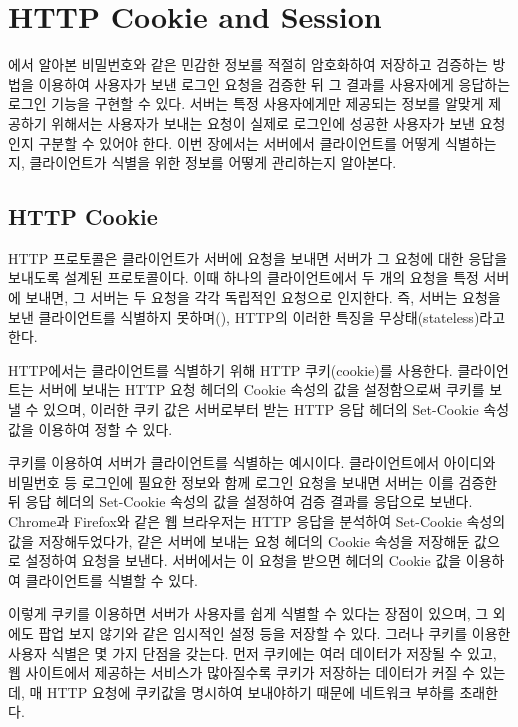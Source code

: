 \section{HTTP Cookie and Session}\label{sect:http-cookie-and-session}

에서 알아본 비밀번호와 같은 민감한 정보를 적절히 암호화하여 저장하고 검증하는 방법을 이용하여 사용자가 보낸 로그인 요청을 검증한 뒤 그 결과를 사용자에게 응답하는 로그인 기능을 구현할 수 있다. 서버는 특정 사용자에게만 제공되는 정보를 알맞게 제공하기 위해서는 사용자가 보내는 요청이 실제로 로그인에 성공한 사용자가 보낸 요청인지 구분할 수 있어야 한다. 이번 장에서는 서버에서 클라이언트를 어떻게 식별하는지, 클라이언트가 식별을 위한 정보를 어떻게 관리하는지 알아본다.

\subsection*{HTTP Cookie}

HTTP 프로토콜은 클라이언트가 서버에 요청을 보내면 서버가 그 요청에 대한 응답을 보내도록 설계된 프로토콜이다. 이때 하나의 클라이언트에서 두 개의 요청을 특정 서버에 보내면, 그 서버는 두 요청을 각각 독립적인 요청으로 인지한다. 즉, 서버는 요청을 보낸 클라이언트를 식별하지 못하며(), HTTP의 이러한 특징을 무상태(stateless)라고 한다.

HTTP에서는 클라이언트를 식별하기 위해 HTTP 쿠키(cookie)를 사용한다. 클라이언트는 서버에 보내는 HTTP 요청 헤더의 Cookie 속성의 값을 설정함으로써 쿠키를 보낼 수 있으며, 이러한 쿠키 값은 서버로부터 받는 HTTP 응답 헤더의 Set-Cookie 속성값을 이용하여 정할 수 있다.

\는 쿠키를 이용하여 서버가 클라이언트를 식별하는 예시이다. 클라이언트에서 아이디와 비밀번호 등 로그인에 필요한 정보와 함께 로그인 요청을 보내면 서버는 이를 검증한 뒤 응답 헤더의 Set-Cookie 속성의 값을 설정하여 검증 결과를 응답으로 보낸다. Chrome과 Firefox와 같은 웹 브라우저는 HTTP 응답을 분석하여 Set-Cookie 속성의 값을 저장해두었다가, 같은 서버에 보내는 요청 헤더의 Cookie 속성을 저장해둔 값으로 설정하여 요청을 보낸다. 서버에서는 이 요청을 받으면 헤더의 Cookie 값을 이용하여 클라이언트를 식별할 수 있다.

이렇게 쿠키를 이용하면 서버가 사용자를 쉽게 식별할 수 있다는 장점이 있으며, 그 외에도 팝업 보지 않기와 같은 임시적인 설정 등을 저장할 수 있다. 그러나 쿠키를 이용한 사용자 식별은 몇 가지 단점을 갖는다. 먼저 쿠키에는 여러 데이터가 저장될 수 있고, 웹 사이트에서 제공하는 서비스가 많아질수록 쿠키가 저장하는 데이터가 커질 수 있는데, 매 HTTP 요청에 쿠키값을 명시하여 보내야하기 때문에 네트워크 부하를 초래한다.


